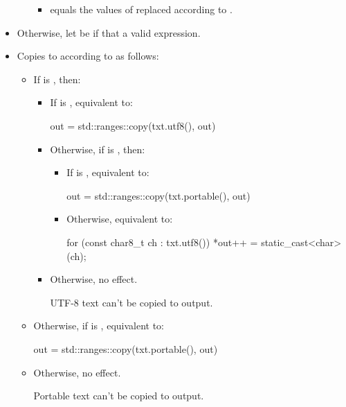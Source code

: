\begin{itemdescr}
\begin{itemize}
\begin{itemize}
\begin{itemize}
\item
{} equals the  values of  replaced according to .
\end{itemize}
\end{itemize}
\item
Otherwise, let  be  if that a valid expression.
\item
Copies  to  according to  as follows:
\begin{itemize}
\item
If  is , then:
\begin{itemize}
\item
If  is , equivalent to:
\begin{codeblock}
out = std::ranges::copy(txt.utf8(), out)
\end{codeblock}
\item
Otherwise, if  is , then:
\begin{itemize}
\item
If  is , equivalent to:
\begin{codeblock}
out = std::ranges::copy(txt.portable(), out)
\end{codeblock}
\item
Otherwise, equivalent to:
\begin{codeblock}
for (const char8_t ch : txt.utf8()) *out++ = static_cast<char>(ch);
\end{codeblock}
\end{itemize}
\item
Otherwise, no effect.
\begin{note}
UTF-8 text can't be copied to  output.
\end{note}
\end{itemize}
\item
Otherwise, if  is , equivalent to:
\begin{codeblock}
out = std::ranges::copy(txt.portable(), out)
\end{codeblock}
\item
Otherwise, no effect.
\begin{note}
Portable text can't be copied to  output.
\end{note}
\end{itemize}
\end{itemize}


\end{itemdescr}
